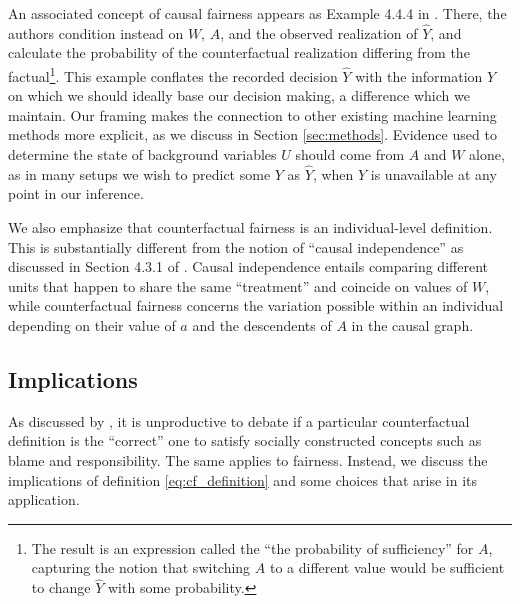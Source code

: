 An associated concept of causal fairness appears as Example 4.4.4 in
\citet{pearl:16}. There, the authors condition instead on $W$, $A$,
and the observed realization of $\hat Y$, and calculate the
probability of the counterfactual realization differing from the
factual\footnote{The result is an expression called the ``the
  probability of sufficiency'' for $A$, capturing the notion that
  switching $A$ to a different value would be sufficient to change
  $\hat Y$ with some probability.}. This example conflates the
recorded decision $\hat Y$ with the information $Y$ on which we should
ideally base our decision making, a difference which we maintain.  Our
framing makes the connection to other existing machine learning
methods more explicit, as we discuss in Section \ref{sec:methods}.
Evidence used to determine the state of background variables $U$
should come from $A$ and $W$ alone, as in many setups we wish to
predict some $Y$ as $\hat Y$, when $Y$ is unavailable at any point in
our inference.

We also emphasize that counterfactual fairness is an individual-level
definition. This is substantially different from the notion of ``causal independence''
as discussed in Section 4.3.1 of \cite{pearl:16}. Causal independence
entails comparing different units that happen to share the
same ``treatment'' and coincide on values of $W$, while
counterfactual fairness concerns the variation possible within an
individual depending on their value of $a$ and the descendents of
$A$ in the causal graph.

\subsection{Implications}
%
As discussed by \citet{halpern:16}, it is unproductive to debate
if a particular counterfactual definition is the ``correct'' one
to satisfy socially constructed concepts such as blame and responsibility.
The same applies to fairness. Instead, we discuss the
implications of definition \eqref{eq:cf_definition} and some choices
that arise in its application.

